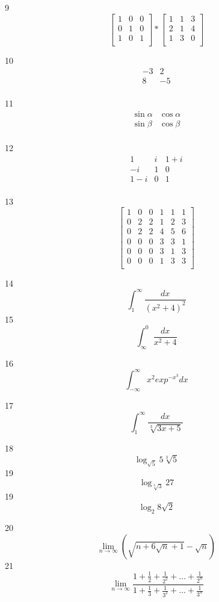 \documentclass[a4paper]{article}
\begin{document}
9
$$
\left[\begin{array} {ccc}
1 & 0 & 0 \\
0 & 1 & 0 \\
1 & 0 & 1 \\
\end{array} \right] *
\left[\begin{array} {ccc}
1 & 1 & 3 \\
2 & 1 & 4 \\
1 & 3 & 0 \\ 
\end{array} \right]
$$

10
$$
\begin{array}{|rr|}
-3& 2 \\
8 & -5 \\
\end{array}
$$

11
$$
\begin{array}{|rr|}
\sin{\alpha} & \cos{\alpha}\\
\sin{\beta} & \cos{\beta}\\
\end{array}
$$

12
$$
\begin{array}{|ccc|}
1 & i & 1+i\\
-i & 1 & 0 \\
1-i & 0 & 1\\
\end{array}
$$

13
$$
\left[\begin{array}{c|cc|ccc}
1 & 0 & 0 & 1 & 1 & 1\\
\hline
0 & 2 & 2 & 1 & 2 & 3 \\
0 & 2 & 2 & 4 & 5 & 6 \\
\hline
0 & 0 & 0 & 3 & 3 & 1\\
0 & 0 & 0 & 3 & 1 & 3\\
0 & 0 & 0 & 1 & 3 & 3 \\
 \end{array}\right]
$$

14
$$
\int_{1} ^ \infty  \frac{dx}{(x^2 +4)^2}
$$
15
$$
\int_\infty ^ 0 \frac{dx}{x^2+4}
$$

16
$$
\int_{-\infty} ^\infty x^2 exp^{-x^3}dx
$$

17
$$
\int_1 ^\infty \frac{dx}{\sqrt[3]{3x+5}}
$$

18
$$
\log_{\sqrt{5}}5\sqrt[3]{5}
$$
19
$$
\log_{\sqrt[3]{3}}27
$$
19
$$
\log_2 8\sqrt{2}
$$

20
$$
\lim_{n\to\infty} \left(\sqrt{n+6\sqrt{n}+1}-\sqrt{n}\right)
$$
21
$$
\lim_{n\to\infty} \frac{1+\frac{1}{2}+\frac{1}{2^2}+\ldots+\frac{1}{2^n}}{1+\frac{1}{3}+\frac{1}{3^2}+\ldots+\frac{1}{3^n}}
$$
\end{document}
